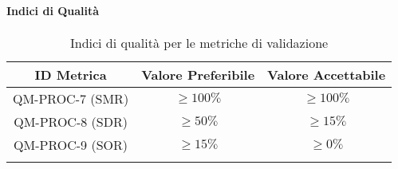 		\paragraph{Indici di Qualità}

			\begin{center}
				\begin{longtable}{|c|c|c|}
				\hline
				\rowcolor{lighter-grayer}
				\textbf{ID Metrica} & \textbf{Valore Preferibile} & \textbf{Valore Accettabile}\\
				\hline
				\endfirsthead
				\hline
				QM-PROC-7 (SMR) & \(\geq 100\%\) & \(\geq 100\%\) \\
				\hline
				QM-PROC-8 (SDR) & \(\geq 50\%\) & \(\geq 15\%\) \\
				\hline
				QM-PROC-9 (SOR) & \(\geq 15\%\) & \(\geq 0\%\) \\
				\hline
				\caption{Indici di qualità per le metriche di validazione}
				\end{longtable}
			\end{center}






